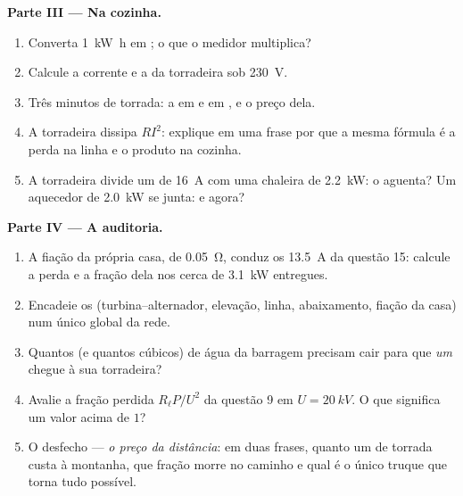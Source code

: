 \begin{problem}
\medskip
\noindent\textbf{Parte III --- Na cozinha.}
\begin{enumerate}[resume]
  \item Converta \qty{1}{kW.h} em ; o que o medidor multiplica?
  \item Calcule a corrente e a  da torradeira sob \qty{230}{V}.
  \item Três minutos de torrada: a  em  e em
        , e o preço dela.
  \item A torradeira dissipa $RI^2$: explique em uma frase por que a mesma
        fórmula é a perda na linha e o produto na cozinha.
  \item A torradeira divide um  de \qty{16}{A} com uma chaleira de
        \qty{2.2}{kW}: o  aguenta? Um aquecedor de \qty{2.0}{kW}
        se junta: e agora?
\end{enumerate}

\medskip
\noindent\textbf{Parte IV --- A auditoria.}
\begin{enumerate}[resume]
  \item A fiação da própria casa, de  \qty{0.05}{\ohm},
        conduz os \qty{13.5}{A} da questão 15: calcule a perda e a fração
        dela nos cerca de \qty{3.1}{kW} entregues.
  \item Encadeie os  (turbina--alternador, elevação, linha,
        abaixamento, fiação da casa) num único  global da rede.
  \item Quantos  (e quantos  cúbicos) de água da
        barragem precisam cair para que \emph{um}  chegue à
        sua torradeira?
  \item Avalie a fração perdida $R_\ell P/U^2$ da questão 9 em
        $U = \qty{20}{kV}$. O que significa um valor acima de $1$?
  \item O desfecho --- \emph{o preço da distância}: em duas frases, quanto
        um  de torrada custa à montanha, que fração morre
        no caminho e qual é o único truque que torna tudo possível.
\end{enumerate}
\end{problem}

